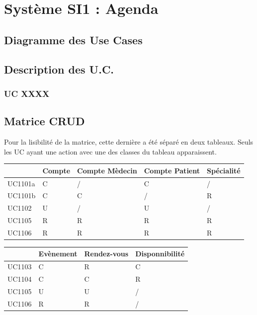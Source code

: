\documentclass[a4paper, 11pt]{report}
\begin{document}
\section{Système SI1 : Agenda}
\subsection{Diagramme des Use Cases}
\subsection{Description des U.C.}
\subsubsection{UC XXXX}

\newpage
\subsection{Matrice CRUD}

Pour la lisibilité de la matrice, cette dernière a été séparé en deux tableaux.
Seuls les UC ayant une action avec une des classes du tableau apparaissent.

\begin{center}
    \begin{longtable}{|p{1.5cm}|p{1.5cm}|p{1.5cm}|p{1.5cm}|p{1.5cm}|}
        \hline
        & Compte & Compte Mèdecin & Compte Patient & Spécialité \\
        \hline
        UC1101a & C & / & C & / \\
        \hline
        UC1101b & C & C & / & R \\
        \hline
        UC1102  & U & / & U & / \\
        \hline
        UC1105  & R & R & R & R \\
        \hline
        UC1106 & R & R & R & R \\
        \hline
        
    \end{longtable}
\end{center}

\begin{center}
    \begin{longtable}{|p{2.2cm}|p{2.2cm}|p{2.2cm}|p{2.2cm}|}
        \hline
        & Evènement & Rendez-vous & Disponnibilité  \\
        \hline
        UC1103 & C & R & C \\
        \hline 
        UC1104 & C & C & R \\
        \hline
        UC1105 & U & U & / \\
        \hline
        UC1106 & R & R & / \\
        \hline
        
    \end{longtable}
\end{center}
\end{document}
